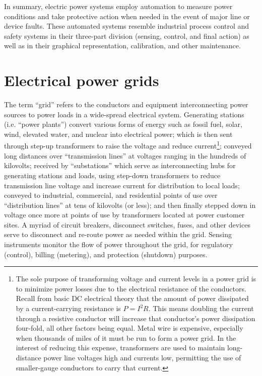 \vskip 10pt

In summary, electric power systems employ automation to measure power conditions and take protective action when needed in the event of major line or device faults.  These automated systems resemble industrial process control and safety systems in their three-part division (sensing, control, and final action) as well as in their graphical representation, calibration, and other maintenance.





\filbreak
\section{Electrical power grids}

The term ``grid'' refers to the conductors and equipment interconnecting power sources to power loads in a wide-spread electrical system.  Generating stations (i.e. ``power plants'') convert various forms of energy such as fossil fuel, solar, wind, elevated water, and nuclear into electrical power; which is then sent through step-up transformers to raise the voltage and reduce current\footnote{The sole purpose of transforming voltage and current levels in a power grid is to minimize power losses due to the electrical resistance of the conductors.  Recall from basic DC electrical theory that the amount of power dissipated by a current-carrying resistance is $P = I^2 R$.  This means doubling the current through a resistive conductor will increase that conductor's power dissipation four-fold, all other factors being equal.  Metal wire is expensive, especially when thousands of miles of it must be run to form a power grid.  In the interest of reducing this expense, transformers are used to maintain long-distance power line voltages high and currents low, permitting the use of smaller-gauge conductors to carry that current.}; conveyed long distances over ``transmission lines'' at voltages ranging in the hundreds of kilovolts; received by ``substations'' which serve as interconnecting hubs for generating stations and loads, using step-down transformers to reduce transmission line voltage and increase current for distribution to local loads; conveyed to industrial, commercial, and residential points of use over ``distribution lines'' at tens of kilovolts (or less); and then finally stepped down in voltage once more at points of use by transformers located at power customer sites.  A myriad of circuit breakers, disconnect switches, fuses, and other devices serve to disconnect and re-route power as needed within the grid.  Sensing instruments monitor the flow of power throughout the grid, for regulatory (control), billing (metering), and protection (shutdown) purposes.

